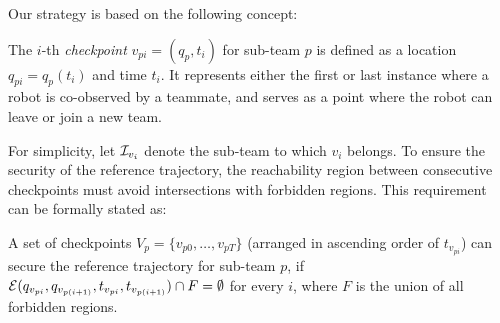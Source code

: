 \documentclass[10pt,twocolumn,twoside]{IEEEtran}
\newcommand{\news}{\color{blue}}
\begin{document}
{\news
Our strategy is based on the following concept:
\begin{definition}
The $i$-th \emph{checkpoint} $v_{pi}=(q_{p},t_{i})$ for sub-team $p$ is defined as a location $q_{pi}=q_{p}(t_i)$ and time $t_{i}$. It represents either the first or last instance where a robot is co-observed by a teammate, and serves as a point where the robot can leave or join a new team.
\end{definition}
For simplicity, let $\mathcal{I}_{v_{i}}$ denote the sub-team to which $v_{i}$ belongs. %
To ensure the security of the reference trajectory, the reachability region between consecutive checkpoints must avoid intersections with forbidden regions. This requirement can be formally stated as:
\begin{remark}\label{rmk:checkpoints}
  A set of checkpoints $V_{p}=\{ v_{p0}, \dots ,v_{pT}\}$ (arranged in ascending order of $t_{v_{pi}}$) can secure the reference trajectory for sub-team $p$, if $\mathcal{E}(q_{v_{pi}}, q_{v_{p(i+1)}}, t_{v_{pi}},t_{v_{p(i+1)}}) \cap F = \emptyset$ for every $i$, where $F$ is the union of all forbidden regions.
  \end{remark}
}
\end{document}
